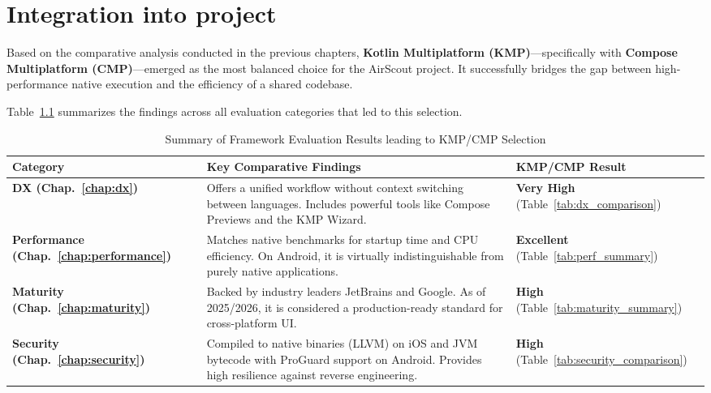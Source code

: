 \chapter{Integration into project}\label{chap:integration}

Based on the comparative analysis conducted in the previous chapters,
\textbf{Kotlin Multiplatform (KMP)}—specifically with \textbf{Compose
    Multiplatform (CMP)}—emerged as the most balanced choice for the AirScout
project. It successfully bridges the gap between high-performance native
execution and the efficiency of a shared codebase.

Table~\ref{tab:kmp_selection_summary} summarizes the findings across all
evaluation categories that led to this selection.

\begin{table}[ht]
    \centering
    \caption{Summary of Framework Evaluation Results leading to KMP/CMP Selection}
    \label{tab:kmp_selection_summary}
    \begin{tabularx}{\textwidth}{|X|X|X|}
        \hline
        \textbf{Category}              & \textbf{Key Comparative Findings}                                                                                                                  & \textbf{KMP/CMP Result}                     \\ \hline
        \textbf{DX (Chap.~\ref{chap:dx})}          & Offers a unified workflow without context switching between languages. Includes powerful tools like Compose Previews and the KMP Wizard.           & \textbf{Very High} (Table~\ref{tab:dx_comparison}) \\ \hline
        \textbf{Performance (Chap.~\ref{chap:performance})} & Matches native benchmarks for startup time and CPU efficiency. On Android, it is virtually indistinguishable from purely native applications.      & \textbf{Excellent} (Table~\ref{tab:perf_summary})   \\ \hline
        \textbf{Maturity (Chap.~\ref{chap:maturity})}    & Backed by industry leaders JetBrains and Google. As of 2025/2026, it is considered a production-ready standard for cross-platform UI.              & \textbf{High} (Table~\ref{tab:maturity_summary})    \\ \hline
        \textbf{Security (Chap.~\ref{chap:security})}    & Compiled to native binaries (LLVM) on iOS and JVM bytecode with ProGuard support on Android. Provides high resilience against reverse engineering. & \textbf{High} (Table~\ref{tab:security_comparison}) \\ \hline
    \end{tabularx}
\end{table}

